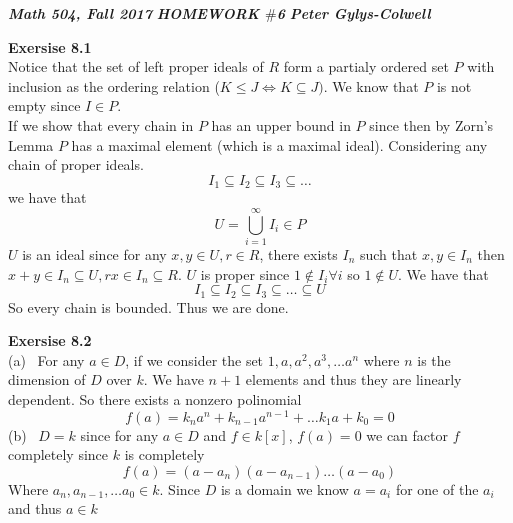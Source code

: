 \documentclass[12pt]{article}
\newenvironment{ques}[1]{\textbf{Exersise #1}\vspace{1 mm}\\ }{\bigskip}
\theoremstyle{definition}
\begin{document}
\noindent \textit{\textbf{Math 504, Fall 2017}} \hspace{1.3cm}
\textit{\textbf{HOMEWORK $\#$6}} \hspace{1.3cm} \textit{\textbf{Peter
Gylys-Colwell}} 

\vspace{1cm}

\begin{ques}{8.1}
	Notice that the set of left proper ideals of $R$ form a partialy ordered
	set $P$ with inclusion as the ordering relation ($K \leq J \Leftrightarrow
	K \subseteq J)$. We know that $P$ is not empty since $I \in P$.\\
	If we show that every chain in $P$ has an upper bound in $P$ since then by
	Zorn's Lemma $P$ has a maximal element (which is a maximal ideal).
	Considering any chain of proper ideals.
	$$I_1 \subseteq I_2 \subseteq I_3 \subseteq \dots $$
	we have that
	$$U = \bigcup_{i = 1}^\infty I_i \in P$$
	$U$ is an ideal since for any $x,y \in U, r \in R$, there exists $I_n$ such that $x,
	y \in I_n$ then $x + y \in I_n \subseteq U, rx \in I_n \subseteq R$. $U$ is proper
	since $1 \notin I_i \forall i$ so $1 \notin U$. We have that 
	$$I_1 \subseteq I_2 \subseteq I_3 \subseteq \dots \subseteq U$$
	So every chain is bounded. Thus we are done.
\end{ques}

\begin{ques}{8.2}
	(a) \ For any $a \in D$, if we consider the set $1, a, a^2, a^3, \dots
	a^{n}$ where $n$ is the dimension of $D$ over $k$. We have $n+1$ elements
	and thus they are linearly dependent. So there exists a nonzero polinomial 
	$$f(a) = k_{n}a^{n} + k_{n - 1}a^{n - 1} + \dots k_1a + k_0 = 0$$
	(b) \ $D = k$ since for any $a \in D$ and $f \in k[x]$, $f(a) = 0$ we can
	factor $f$ completely since $k$ is completely
	$$f(a) = (a - a_n)(a - a_{n-1}) \dots (a - a_0)$$
	Where $a_n, a_{n-1}, \dots a_0 \in k$. Since $D$ is a domain we know $a =
	a_i$ for one of the $a_i$ and thus $a \in k$
\end{ques}
\end{document}
